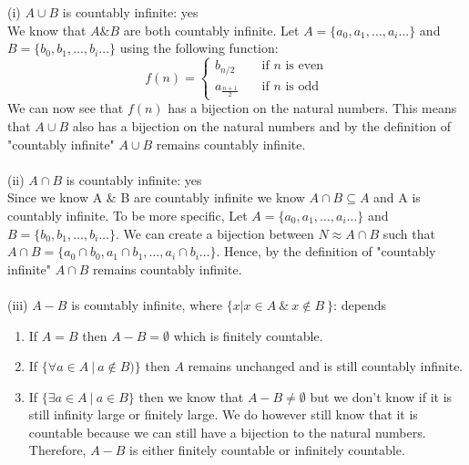 \documentclass[a4paper,12pt]{article}
\begin{document}
(i) $A \cup B$ is countably infinite: yes\\
We know that $A\&B$ are both countably infinite. Let $A=\{a_0, a_1, \dots, a_i \dots \}$ and $B=\{b_0, b_1, \dots, b_i \dots \}$ using the following function:
\[ f(n) = 
	\begin{cases}
	b_{n/2}				& \quad \text{if } n \text{ is even} \\
	a_{\frac{n+1}{2}}	& \quad \text{if } n \text{ is odd}
	\end{cases}
\]  We can now see that $f(n)$ has a bijection on the natural numbers. This means that $A \cup B$ also has a bijection on the natural numbers and by the definition of "countably infinite" $A \cup B$ remains countably infinite.   \\ \\

(ii) $A \cap B$ is countably infinite: yes\\
Since we know A \& B are countably infinite we know $A \cap B \subseteq A$ and A is countably infinite. To be more specific, Let $A=\{a_0, a_1, \dots, a_i \dots \}$ and $B=\{b_0, b_1, \dots, b_i \dots \}$. We can create a bijection between $N \approx A \cap B$ such that $A \cap B = \{a_0 \cap b_0, a_1 \cap b_1, \dots, a_i \cap b_i \dots \}$. Hence, by the definition of "countably infinite" $A \cap B$ remains countably infinite.   \\ \\

(iii) $A - B$ is countably infinite, where $ \{ x | x \in A \: \& \: x \notin B \: \} $: depends \\
\begin{enumerate}
	\item If $A = B$ then $A-B = \emptyset$ which is finitely countable. 
	\item If $\{ \forall a \in A \: | \: a \notin B) \}$ then $A$ remains unchanged and is still countably infinite. 
	\item If $\{ \exists a \in A \: | \: a \in B \}$ then we know that $A - B \neq \emptyset$ but we don't know if it is still infinity large or finitely large. We do however still know that it is countable because we can still have a bijection to the natural numbers. Therefore, $A - B$ is either finitely countable or infinitely countable.
\end{enumerate} 

\newpage
\end{document}
